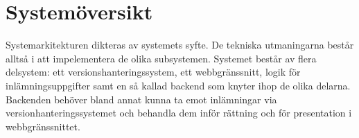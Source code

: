 \section{Systemöversikt}
Systemarkitekturen dikteras av systemets syfte. De tekniska utmaningarna består alltså i att impelementera de olika subsystemen. 
Systemet består av flera delsystem: ett versionshanteringssystem, ett webbgränssnitt, logik för inlämningsuppgifter samt en så kallad backend som knyter ihop de olika delarna. Backenden behöver bland annat kunna ta emot inlämningar via versionhanteringssystemet och behandla dem inför rättning och för presentation i webbgränssnittet.